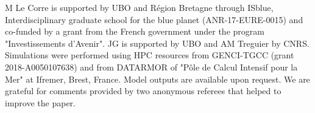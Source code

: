 \documentclass[os, manuscript]{copernicus}
\begin{document}
\noappendix       %









\begin{acknowledgements}
M Le Corre is supported by UBO and Région Bretagne through ISblue, Interdisciplinary graduate school for the blue planet (ANR-17-EURE-0015) and co-funded by a grant from the French government under the program "Investissements d'Avenir". JG  is supported by UBO and AM Treguier by CNRS. Simulations were performed using HPC resources from GENCI-TGCC (grant 2018-A0050107638) and from DATARMOR of "Pôle de Calcul Intensif pour la Mer" at Ifremer, Brest, France. Model outputs are available upon request. We are grateful for comments provided by two anonymous referees that helped to improve the paper.

\end{acknowledgements}




\end{document}
